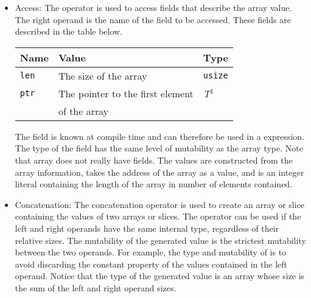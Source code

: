 \begin{itemize}
\item Access: The  operator is used to access fields that describe the
  array value. The right operand is the name of the field to be accessed. These
  fields are described in the table below.

  \begin{center}\begin{adjustbox}{max width=\linewidth}
      \begin{threeparttable}
        \begin{tabular}{|l|ll|}
          \hline
          Name & Value & Type\\
          \hline
          \hline
          \texttt{len} & The size of the array & \texttt{usize} \\
          \texttt{ptr} & The pointer to the first element  & \textit{T}$^{1^{\phantom{J}}}$\\
          & of the array & \\
          \hline
        \end{tabular}
      \end{threeparttable}
\end{adjustbox}\end{center}

The  field is known at compile time and can therefore be used in
a  expression. The type of the  field has the same
level of mutability as the array type. Note that array does not really have
fields. The values are constructed from the array information, 
takes the address of the array as a value, and  is an integer
literal containing the length of the array in number of elements contained.

\item Concatenation: The concatenation operator \token{\~} is used to create an
  array or slice containing the values of two arrays or slices. The operator can
  be used if the left and right operands have the same internal type, regardless
  of their relative sizes. The mutability of the generated value is the
  strictest mutability between the two operands. For example, the type and
  mutability of  is \token{[*i32 ;
      6]} to avoid discarding the constant property of the values contained in
  the left operand. Notice that the type of the generated value is an array
  whose size is the sum of the left and right operand sizes.


\end{itemize}
